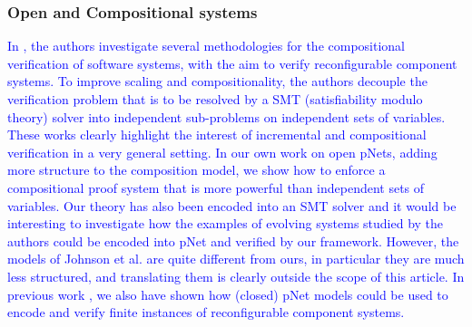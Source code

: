 \documentclass{lmcs}
\newcommand{\TODO}[1]{\textcolor{red}{\textbf{[TODO:#1]}}}
\newcommand{\ERIC}[1]{\textcolor{blue}{#1}}
\begin{document}

\subsubsection*{Open and Compositional systems}
\ERIC{In
\cite{Johnson:2013:CBSE,Johnson:2014:qosa}, the authors investigate several methodologies for the compositional verification of software systems, with the aim to verify reconfigurable component systems. To improve scaling and compositionality, the authors  decouple the verification problem that is to be resolved by a SMT (satisfiability modulo theory) solver into independent sub-problems on independent sets of variables. These works clearly highlight the interest of incremental and compositional verification in a very general setting. In our own work on open pNets, adding more structure to the composition model, we show how to enforce a compositional proof system that is more powerful than independent sets of variables. Our theory has also been encoded into an SMT solver and it would be interesting to investigate how the examples of evolving systems studied by the authors could be encoded into pNet and verified by our framework. However, the models of Johnson et al. are quite different from ours, in particular they are much less structured, and translating them is clearly outside the scope of this article.
In previous work \cite{gaspar:hal-00916115}, we also have shown how (closed) pNet models could be used to encode and verify finite instances of reconfigurable component systems. }

\end{document}
